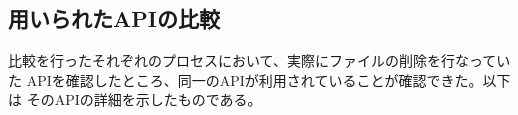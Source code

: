 \documentclass[dvipdfmx,autodetect-engine]{jsarticle}
\begin{document}
\begin{figure}[H]
  \centering
  \caption{}
\end{figure}

\begin{figure}[H]
  \centering
  \caption{}
\end{figure}

\subsection{用いられたAPIの比較}

比較を行ったそれぞれのプロセスにおいて、実際にファイルの削除を行なっていた
APIを確認したところ、同一のAPIが利用されていることが確認できた。以下は
そのAPIの詳細を示したものである。

\begin{figure}[H]
  \centering
  \caption{}
\end{figure}
\end{document}
